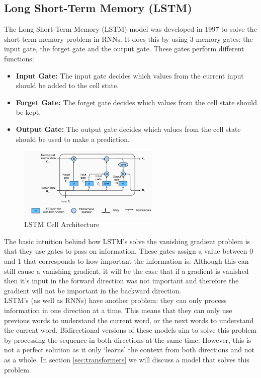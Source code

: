 \subsection{Long Short-Term Memory (LSTM)}
The Long Short-Term Memory (LSTM) model was developed in 1997 to solve the short-term memory problem in RNNs. It does this by
using 3 memory gates: the input gate, the forget gate and the output gate. These gates perform different functions:
\begin{itemize}
    \item \textbf{Input Gate:} The input gate decides which values from the current input should be added to the cell state.
    \item \textbf{Forget Gate:} The forget gate decides which values from the cell state should be kept.
    \item \textbf{Output Gate:} The output gate decides which values from the cell state should be used to make a prediction.
\end{itemize}
\begin{figure}
    \centering
    \includegraphics[width=0.6\textwidth]{../images/lstm.png}
    \caption{LSTM Cell Architecture}
    \label{fig:lstm}
\end{figure}
The basic intuition behind how LSTM's solve the vanishing gradient problem is that they use gates to pass on information.
These gates assign a value between 0 and 1 that corresponds to how important the information is. Although this can still
cause a vanishing gradient, it will be the case that if a gradient is vanished then it's input in the forward direction
was not important and therefore the gradient will not be important in the backward direction.\\

LSTM's (as well as RNNs) have another problem: they can only process information in one direction at a time. This means that 
they can only use previous words to understand the current word, or the next words to understand the current word. Bidirectional
versions of these models aim to solve this problem by processing the sequence in both directions at the same time. However, this
is not a perfect solution as it only `learns' the context from both directions and not as a whole. In section \ref{sec:transformers}
we will discuss a model that solves this problem.

